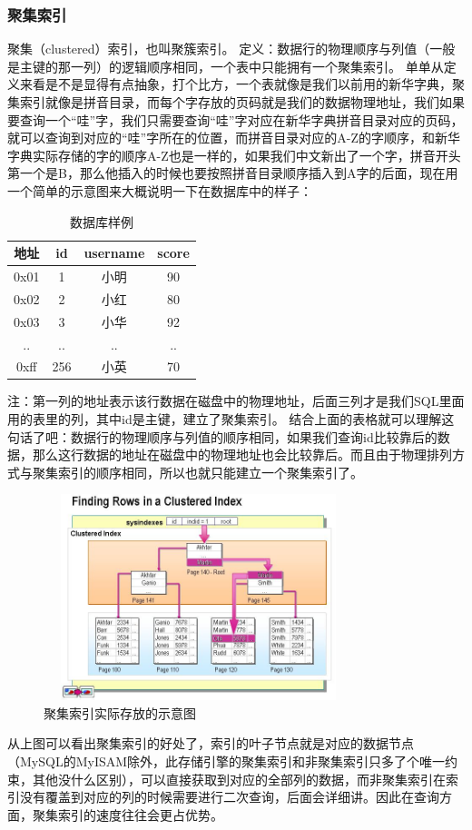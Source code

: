 \documentclass[UTF8]{ctexart}
\begin{document}
\subsubsection{聚集索引}
聚集（clustered）索引，也叫聚簇索引。
定义：数据行的物理顺序与列值（一般是主键的那一列）的逻辑顺序相同，一个表中只能拥有一个聚集索引。
单单从定义来看是不是显得有点抽象，打个比方，一个表就像是我们以前用的新华字典，聚集索引就像是拼音目录，而每个字存放的页码就是我们的数据物理地址，我们如果要查询一个“哇”字，我们只需要查询“哇”字对应在新华字典拼音目录对应的页码，就可以查询到对应的“哇”字所在的位置，而拼音目录对应的A-Z的字顺序，和新华字典实际存储的字的顺序A-Z也是一样的，如果我们中文新出了一个字，拼音开头第一个是B，那么他插入的时候也要按照拼音目录顺序插入到A字的后面，现在用一个简单的示意图来大概说明一下在数据库中的样子：
\begin{table}[]
    \caption{数据库样例}
    \vspace{20pt}
    \centering
    \begin{tabular}{c|c|c|c}
        \hline
        地址 & id  & username & score\\
        \hline
        0x01&	1	&小明	&90\\
		0x02	&2	&小红&	80\\
		0x03&	3	&小华&	92\\
		..	&..	&..	&..\\
		0xff&	256	&小英&	70\\
        \hline       
    \end{tabular}
    \label{bs13}
\end{table}
注：第一列的地址表示该行数据在磁盘中的物理地址，后面三列才是我们SQL里面用的表里的列，其中id是主键，建立了聚集索引。
结合上面的表格就可以理解这句话了吧：数据行的物理顺序与列值的顺序相同，如果我们查询id比较靠后的数据，那么这行数据的地址在磁盘中的物理地址也会比较靠后。而且由于物理排列方式与聚集索引的顺序相同，所以也就只能建立一个聚集索引了。
\begin{figure}[htbp]
\centering
\includegraphics[height=6cm,width=9cm]{Figure/index0.png}
\caption{聚集索引实际存放的示意图}
\end{figure}
从上图可以看出聚集索引的好处了，索引的叶子节点就是对应的数据节点（MySQL的MyISAM除外，此存储引擎的聚集索引和非聚集索引只多了个唯一约束，其他没什么区别），可以直接获取到对应的全部列的数据，而非聚集索引在索引没有覆盖到对应的列的时候需要进行二次查询，后面会详细讲。因此在查询方面，聚集索引的速度往往会更占优势。
\end{document}
